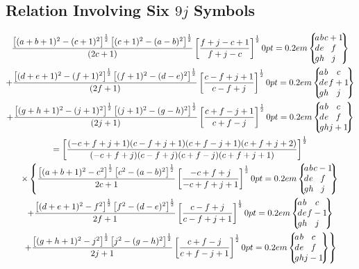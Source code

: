 \subsection{Relation Involving Six $9 j$ Symbols}\label{sec:10.5.4}
\begin{gather}
\frac{\left[(a+b+1)^{2}-(c+1)^{2}\right]^{\frac{1}{2}}\left[(c+1)^{2}-(a-b)^{2}\right]^{\frac{1}{2}}}{(2 c+1)}\left[\frac{f+j-c+1}{f+j-c}\right]^{\frac{1}{2}}\ninej{a}{b}{c+1}{d}{e}{f}{g}{h}{j}  \notag\\
+\frac{\left[(d+e+1)^{2}-(f+1)^{2}\right]^{\frac{1}{2}}\left[(f+1)^{2}-(d-e)^{2}\right]^{\frac{1}{2}}}{(2 f+1)}\left[\frac{c-f+j+1}{c-f+j}\right]^{\frac{1}{2}}\ninej{a}{b}{c}{d}{e}{f+1}{g}{h}{j}  \notag\\
+\frac{\left[(g+h+1)^{2}-(j+1)^{2}\right]^{\frac{1}{2}}\left[(j+1)^{2}-(g-h)^{2}\right]^{\frac{1}{2}}}{(2 j+1)}\left[\frac{c+f-j+1}{c+f-j}\right]^{\frac{1}{2}}\ninej{a}{b}{c}{d}{e}{f}{g}{h}{j+1}  \notag\\
=\left[\frac{(-c+f+j+1)(c-f+j+1)(c+f-j+1)(c+f+j+2)}{(-c+f+j)(c-f+j)(c+f-j)(c+f+j+1)}\right]^{\frac{1}{2}}  \notag\\
\times\left\{\frac{\left[(a+b+1)^{2}-c^{2}\right]^{\frac{1}{2}}\left[c^{2}-(a-b)^{2}\right]^{\frac{1}{2}}}{2 c+1}\left[\frac{-c+f+j}{-c+f+j+1}\right]^{\frac{1}{2}}\ninej{a}{b}{c-1}{d}{e}{f}{g}{h}{j}\right.  \notag\\
+\frac{\left[(d+e+1)^{2}-f^{2}\right]^{\frac{1}{2}}\left[f^{2}-(d-e)^{2}\right]^{\frac{1}{2}}}{2 f+1}\left[\frac{c-f+j}{c-f+j+1}\right]^{\frac{1}{2}}\ninej{a}{b}{c}{d}{e}{f-1}{g}{h}{j}  \notag\\
\left.+\frac{\left[(g+h+1)^{2}-j^{2}\right]^{\frac{1}{2}}\left[j^{2}-(g-h)^{2}\right]^{\frac{1}{2}}}{2 j+1}\left[\frac{c+f-j}{c+f-j+1}\right]^{\frac{1}{2}}\ninej{a}{b}{c}{d}{e}{f}{g}{h}{j-1}\right\} \label{eq:10:5:10}
\end{gather}
